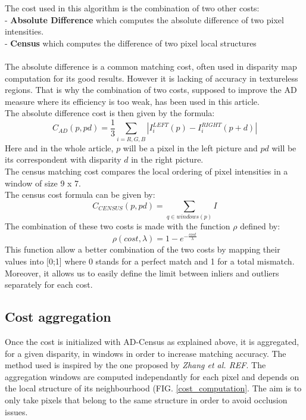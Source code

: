 \documentclass{ipol}
\begin{document}
The cost used in this algorithm is the combination of two other costs:\\
	- \textbf{ Absolute Difference} which computes the absolute difference of two pixel intensities.\\
	- \textbf{ Census} which computes the difference of two pixel local structures\\
\\ 
The absolute difference is a common matching cost, often used in disparity map computation for its good results. However it is lacking of accuracy in textureless regions. That is why the combination of two costs, supposed to improve the AD measure where its efficiency is too weak, has been used in this article.\\
The absolute difference cost is then given by the formula:
\[
	C_{AD}(p, pd) = \frac{1}{3} \sum_{i = R, G, B}  | I_i^{LEFT}(p) - I_i^{RIGHT}(p+d) | 
\]
Here and in the whole article, $p$ will be a pixel in the left picture and $pd$ will be its correspondent with disparity $d$ in the right picture.\\
The census matching cost compares the local ordering of pixel intensities in a window of size 9 x 7.\\
The census cost formula can be given by:
\[
	C_{CENSUS}(p, pd) = \sum_{q \in windows(p)} I
\]
The combination of these two costs is made with the function $\rho$ defined by:
\[
	\rho(cost, \lambda) = 1 - e^{-\frac{cost}{\lambda}}
\]
This function allow a better combination of the two costs by mapping their values into [0;1] where 0 stands for a perfect match and 1 for a total mismatch. Moreover, it allows us to easily define the limit between inliers and outliers separately for each cost.\\

\subsection{ Cost aggregation }

Once the cost is initialized with AD-Census as explained above, it is aggregated, for a given disparity, in windows in order to increase matching accuracy. The method used is inspired by the one proposed by \textit{ Zhang et al. REF}.
The aggregation windows are computed independantly for each pixel and depends on the local structure of its neighbourhood (FIG. \ref{cost_computation}. The aim is to only take pixels that belong to the same structure in order to avoid occlusion issues.\\
\end{document}
